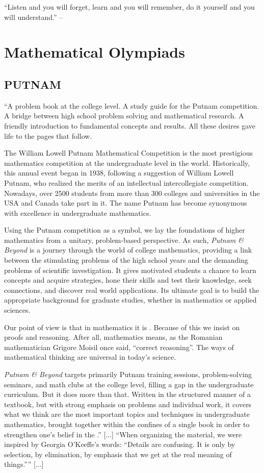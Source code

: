\documentclass[oneside]{book}
\numberwithin{equation}{section}
\begin{document}
``Listen and you will forget, learn and you will remember, do it yourself and you will understand.'' -- \cite[p. 6]{Gelca_Andreescu2017}

\section{Mathematical Olympiads}

\subsection{PUTNAM}
``A problem book at the college level. A study guide for the Putnam competition. A bridge between high school problem solving and mathematical research. A friendly introduction to fundamental concepts and results. All these desires gave life to the pages that follow.

The William Lowell Putnam Mathematical Competition is the most prestigious mathematics competition at the undergraduate level in the world. Historically, this annual event began in 1938, following a suggestion of William Lowell Putnam, who realized the merits of an intellectual intercollegiate competition. Nowadays, over 2500 students from more than 300 colleges and universities in the USA and Canada take part in it. The name Putnam has become synonymous with excellence in undergraduate mathematics.

Using the Putnam competition as a symbol, we lay the foundations of higher mathematics from a unitary, problem-based perspective. As such, \textit{Putnam \& Beyond} is a journey through the world of college mathematics, providing a link between the stimulating problems of the high school years and the demanding problems of scientific investigation. It gives motivated students a chance to learn concepts and acquire strategies, hone their skills and test their knowledge, seek connections, and discover real world applications. Its ultimate goal is to build the appropriate background for graduate studies, whether in mathematics or applied sciences.

Our point of view is that in mathematics it is . Because of this we insist on proofs and reasoning. After all, mathematics means, as the Romanian mathematician Grigore Moisil once said, ``correct reasoning''. The ways of mathematical thinking are universal in today's science.

\textit{Putnam \& Beyond} targets primarily Putnam training sessions, problem-solving seminars, and math clubs at the college level, filling a gap in the undergraduate curriculum. But it does more than that. Written in the structured manner of a textbook, but with strong emphasis on problems and individual work, it covers what we think are the most important topics and techniques in undergraduate mathematics, brought together within the confines of a single book in order to strengthen one's belief in the .'' [$\ldots$] ``When organizing the material, we were inspired by Georgia O'Keeffe's words: ``Details are confusing. It is only by selection, by elimination, by emphasis that we get at the real meaning of things.'''' [$\ldots$]
\end{document}
